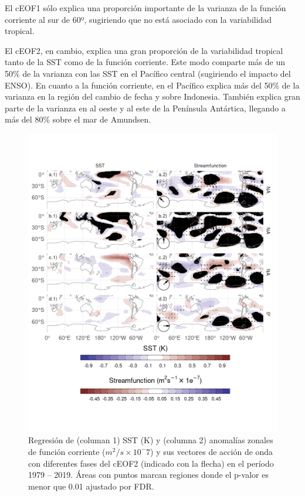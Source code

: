 \documentclass[12pt,oneside]{reedthesis}
\begin{document}
El cEOF1 sólo explica una proporción importante de la varianza de la función corriente al sur de 60º, sugiriendo que no está asociado con la variabilidad tropical.

El cEOF2, en cambio, explica una gran proporción de la variabilidad tropical tanto de la SST como de la función corriente.
Este modo comparte más de un 50\% de la varianza con las SST en el Pacífico central (sugiriendo el impacto del ENSO).
En cuanto a la función corriente, en el Pacífico explica más del 50\% de la varianza en la región del cambio de fecha y sobre Indonesia.
También explica gran parte de la varianza en al oeste y al este de la Península Antártica, llegando a más del 80\% sobre el mar de Amundsen.




\begin{figure}
\includegraphics{figures/20-ceofs/sst-psi-2-1} \caption{Regresión de (columan 1) SST (K) y (columna 2) anomalías zonales de función corriente (\(m^2/s\times10^-7\)) y sus vectores de acción de onda con diferentes fases del cEOF2 (indicado con la flecha) en el período 1979 -- 2019.
Áreas con puntos marcan regiones donde el p-valor es menor que 0.01 ajustado por FDR.}\label{fig:sst-psi-2}
\end{figure}
\end{document}
